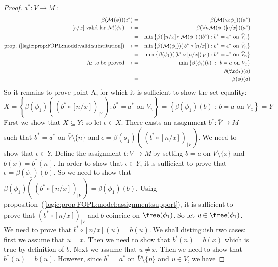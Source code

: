 \begin{proof}
$a^{*}:\bar{V}\to M$\,:
    \begin{eqnarray*}
    \beta({\cal M}(\phi))(a^{*})&=&\beta({\cal M}(\forall x\phi_{1}))(a^{*})\\
    \mbox{$[n/x]$\ valid for\ }{\cal M}(\phi_{1})\ \rightarrow
    &=&\beta(\,\forall n{\cal M}(\phi_{1})[n/x]\,)(a^{*})\\
    &=&\min\left\{\beta(\,[n/x]\circ{\cal M}(\phi_{1})\,)(b^{*}):
    b^{*}=a^{*}\mbox{\ on\ }\bar{V}_{n}\right\}\\
    \mbox{prop.~(\ref{logic:prop:FOPL:model:valid:substitution})}\ \rightarrow
    &=&\min\left\{\beta({\cal M}(\phi_{1}))(\,b^{*}\circ[n/x]\,):
    b^{*}=a^{*}\mbox{\ on\ }\bar{V}_{n}\right\}\\
    &=&\min\left\{\beta(\phi_{1})(\,(b^{*}\circ[n/x])_{|V}\,):
    b^{*}=a^{*}\mbox{\ on\ }\bar{V}_{n}\right\}\\
    \mbox{A: to be proved}\ \rightarrow&=&\min\left\{\beta(\phi_{1})(b)\ :\
    b=a\mbox{\ on\ }V_{x}\right\}\\
    &=&\beta(\forall x\phi_{1})(a)\\
    &=&\beta(\phi)(a)\\
    \end{eqnarray*}
So it remains to prove point A, for which it is sufficient to show
the set equality:
    \[
    X=\left\{\beta(\phi_{1})(\,(b^{*}\circ[n/x])_{|V}\,):
    b^{*}=a^{*}\mbox{\ on\ }\bar{V}_{n}\right\}=\left\{\beta(\phi_{1})(b)\ :\
    b=a\mbox{\ on\ }V_{x}\right\}=Y
    \]
First we show that $X\subseteq Y$: so let $\epsilon\in X$. There
exists an assignment $b^{*}:\bar{V}\to M$ such that $b^{*}=a^{*}$ on
$\bar{V}\setminus\{n\}$ and
$\epsilon=\beta(\phi_{1})(\,(b^{*}\circ[n/x])_{|V}\,)$. We need to
show that $\epsilon\in Y$. Define the assignment $b:V\to M$ by
setting $b=a$ on $V\setminus\{x\}$ and $b(x)= b^{*}(n)$. In order to
show that $\epsilon\in Y$, it is sufficient to prove that
$\epsilon=\beta(\phi_{1})(b)$. So we need to show that
$\beta(\phi_{1})(\,(b^{*}\circ[n/x])_{|V}\,)=\beta(\phi_{1})(b)$.
Using proposition~(\ref{logic:prop:FOPL:model:assignment:support}),
it is sufficient to prove that $(b^{*}\circ[n/x])_{|V}$ and $b$
coincide on $\free(\phi_{1})$. So let $u\in\free(\phi_{1})$. We need
to prove that $b^{*}\circ[n/x](u)=b(u)$. We shall distinguish two
cases: first we assume that $u=x$. Then we need to show that
$b^{*}(n)=b(x)$ which is true by definition of $b$. Next we assume
that $u\neq x$. Then we need to show that $b^{*}(u)=b(u)$. However,
since $b^{*}=a^{*}$ on $\bar{V}\setminus\{n\}$ and $u\in V$, we have

\end{proof}
